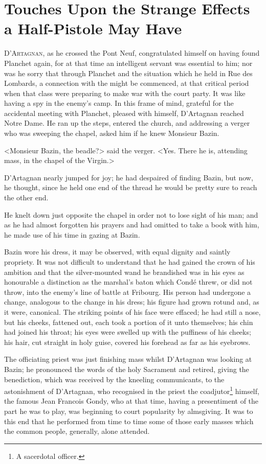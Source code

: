 \chapter{Touches Upon the Strange Effects a Half-Pistole May Have}

 \lettrine{D}{'Artagnan}, as he crossed the Pont Neuf, congratulated himself on having found Planchet again, for at that time an intelligent servant was essential to him; nor was he sorry that through Planchet and the situation which he held in Rue des Lombards, a connection with the  might be commenced, at that critical period when that class were preparing to make war with the court party. It was like having a spy in the enemy's camp. In this frame of mind, grateful for the accidental meeting with Planchet, pleased with himself, D'Artagnan reached Notre Dame. He ran up the steps, entered the church, and addressing a verger who was sweeping the chapel, asked him if he knew Monsieur Bazin.

<Monsieur Bazin, the beadle?> said the verger. <Yes. There he is, attending mass, in the chapel of the Virgin.>

D'Artagnan nearly jumped for joy; he had despaired of finding Bazin, but now, he thought, since he held one end of the thread he would be pretty sure to reach the other end.

He knelt down just opposite the chapel in order not to lose sight of his man; and as he had almost forgotten his prayers and had omitted to take a book with him, he made use of his time in gazing at Bazin.

Bazin wore his dress, it may be observed, with equal dignity and saintly propriety. It was not difficult to understand that he had gained the crown of his ambition and that the silver-mounted wand he brandished was in his eyes as honourable a distinction as the marshal's baton which Condé threw, or did not throw, into the enemy's line of battle at Fribourg. His person had undergone a change, analogous to the change in his dress; his figure had grown rotund and, as it were, canonical. The striking points of his face were effaced; he had still a nose, but his cheeks, fattened out, each took a portion of it unto themselves; his chin had joined his throat; his eyes were swelled up with the puffiness of his cheeks; his hair, cut straight in holy guise, covered his forehead as far as his eyebrows.

The officiating priest was just finishing mass whilst D'Artagnan was looking at Bazin; he pronounced the words of the holy Sacrament and retired, giving the benediction, which was received by the kneeling communicants, to the astonishment of D'Artagnan, who recognised in the priest the coadjutor\footnote{A sacerdotal officer.} himself, the famous Jean Francois Gondy, who at that time, having a presentiment of the part he was to play, was beginning to court popularity by almsgiving. It was to this end that he performed from time to time some of those early masses which the common people, generally, alone attended. 

